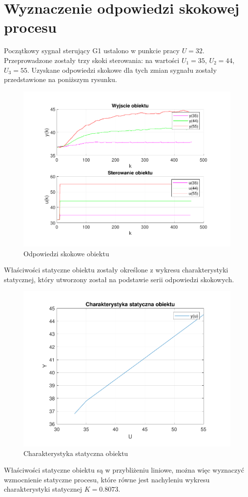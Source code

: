 \section{Wyznaczenie odpowiedzi skokowej procesu}

Początkowy sygnał sterujący G1 ustalono w punkcie pracy $U=32$. 
Przeprowadzone zostały trzy skoki sterowania: na wartości $U_{1}=35$, $U_{2}=44$, $U_{3}=55$. 
Uzyskane odpowiedzi skokowe dla tych zmian sygnału zostały przedstawione na poniższym rysunku.

\begin{figure}[H]
    \centering
    \includegraphics[scale=0.90]{../lab/zad_2/zad2y.pdf}
    \caption{Odpowiedzi skokowe obiektu}
\end{figure}


Właściwości statyczne obiektu zostały określone z wykresu charakterystyki statycznej, 
który utworzony został na podstawie serii odpowiedzi skokowych. 

\begin{figure}[H]
    \centering
    \includegraphics[scale=0.90]{../lab/zad_2/char_stat.pdf}
    \caption{Charakterystyka statyczna obiektu}
\end{figure}

Właściwości statyczne obiektu są w przybliżeniu liniowe, 
można więc wyznaczyć wzmocnienie statyczne procesu, 
które równe jest nachyleniu wykresu charakterystyki statycznej $K=\num{0.8073}$.
